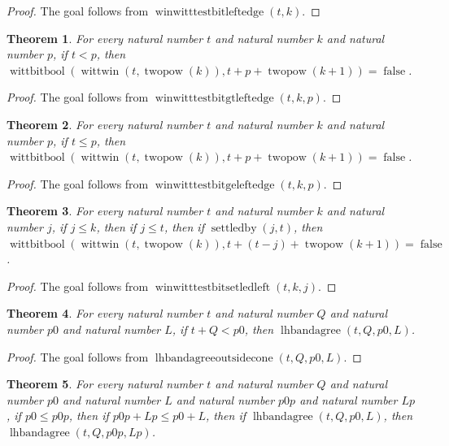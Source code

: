 \documentclass[11pt]{article}
\newtheorem{theorem}{Theorem}[section]
\theoremstyle{definition}
\begin{document}
\begin{proof}
The goal follows from \(\operatorname{winwitttestbitleftedge}(t, k)\).
\end{proof}
\begin{theorem}
\label{ll:paper:winwitt-testbit-gt-left-edge}
For every natural number \(t\) and natural number \(k\) and natural number \(p\), if \(t < p\), then \(\operatorname{wittbitbool}(\operatorname{wittwin}(t, \operatorname{twopow}(k)), t + p + \operatorname{twopow}(k + 1)) = \operatorname{false}\).
\end{theorem}
\begin{proof}
The goal follows from \(\operatorname{winwitttestbitgtleftedge}(t, k, p)\).
\end{proof}
\begin{theorem}
\label{ll:paper:winwitt-testbit-ge-left-edge}
For every natural number \(t\) and natural number \(k\) and natural number \(p\), if \(t \le p\), then \(\operatorname{wittbitbool}(\operatorname{wittwin}(t, \operatorname{twopow}(k)), t + p + \operatorname{twopow}(k + 1)) = \operatorname{false}\).
\end{theorem}
\begin{proof}
The goal follows from \(\operatorname{winwitttestbitgeleftedge}(t, k, p)\).
\end{proof}
\begin{theorem}
\label{ll:paper:winwitt-testbit-settled-left}
For every natural number \(t\) and natural number \(k\) and natural number \(j\), if \(j \le k\), then if \(j \le t\), then if \(\operatorname{settledby}(j, t)\), then \(\operatorname{wittbitbool}(\operatorname{wittwin}(t, \operatorname{twopow}(k)), t + (t - j) + \operatorname{twopow}(k + 1)) = \operatorname{false}\).
\end{theorem}
\begin{proof}
The goal follows from \(\operatorname{winwitttestbitsetledleft}(t, k, j)\).
\end{proof}
\begin{theorem}
\label{ll:paper:lhbandagree-outside-cone}
For every natural number \(t\) and natural number \(Q\) and natural number \(p0\) and natural number \(L\), if \(t + Q < p0\), then \(\operatorname{lhbandagree}(t, Q, p0, L)\).
\end{theorem}
\begin{proof}
The goal follows from \(\operatorname{lhbandagreeoutsidecone}(t, Q, p0, L)\).
\end{proof}
\begin{theorem}
\label{ll:paper:lhbandagree-mono}
For every natural number \(t\) and natural number \(Q\) and natural number \(p0\) and natural number \(L\) and natural number \(p0p\) and natural number \(Lp\), if \(p0 \le p0p\), then if \(p0p + Lp \le p0 + L\), then if \(\operatorname{lhbandagree}(t, Q, p0, L)\), then \(\operatorname{lhbandagree}(t, Q, p0p, Lp)\).
\end{theorem}
\end{document}
